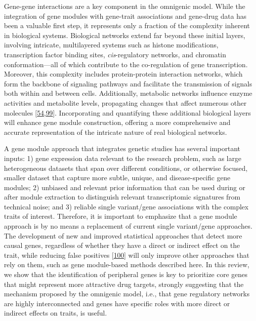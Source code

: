 Gene-gene interactions are a key component in the omnigenic model.
While the integration of gene modules with gene-trait associations and gene-drug data has been a valuable first step, it represents only a fraction of the complexity inherent in biological systems.
Biological networks extend far beyond these initial layers, involving intricate, multilayered systems such as histone modifications, transcription factor binding sites, \emph{cis}-regulatory networks, and chromatin conformation---all of which contribute to the co-regulation of gene transcription.
Moreover, this complexity includes protein-protein interaction networks, which form the backbone of signaling pathways and facilitate the transmission of signals both within and between cells.
Additionally, metabolic networks influence enzyme activities and metabolite levels, propagating changes that affect numerous other molecules {[}\protect\hyperlink{ref-dg9nKuy0}{54},\protect\hyperlink{ref-KNAOTAKP}{99}{]}.
Incorporating and quantifying these additional biological layers will enhance gene module construction, offering a more comprehensive and accurate representation of the intricate nature of real biological networks.

A gene module approach that integrates genetic studies has several important inputs: 1) gene expression data relevant to the research problem, such as large heterogeneous datasets that span over different conditions, or otherwise focused, smaller dataset that capture more subtle, unique, and disease-specific gene modules; 2) unbiased and relevant prior information that can be used during or after module extraction to distinguish relevant transcriptomic signatures from technical noise; and 3) reliable single variant/gene associations with the complex traits of interest.
Therefore, it is important to emphasize that a gene module approach is by no means a replacement of current single variant/gene approaches.
The development of new and improved statistical approaches that detect more causal genes, regardless of whether they have a direct or indirect effect on the trait, while reducing false positives {[}\protect\hyperlink{ref-i8Qjy4pw}{100}{]} will only improve other approaches that rely on them, such as gene module-based methods described here.
In this review, we show that the identification of peripheral genes is key to prioritize core genes that might represent more attractive drug targets, strongly suggesting that the mechanism proposed by the omnigenic model, i.e., that gene regulatory networks are highly interconnected and genes have specific roles with more direct or indirect effects on traits, is useful.

